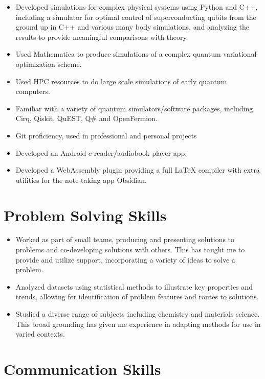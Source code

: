 \documentclass[margin, 10pt]{res} %
\begin{document}
\begin{resume}
\begin{itemize}
    \item Developed simulations for complex physical systems using
    Python and C++, including a simulator for optimal control of
    superconducting qubits from the ground up in C++ and various
    many body simulations, and analyzing the results to provide
    meaningful comparisons with theory.
    \item Used Mathematica to produce simulations of a complex quantum variational optimization scheme. 
    \item Used HPC resources to do large scale simulations of early
    quantum computers.
    \item Familiar with a variety of quantum simulators/software packages,
    including Cirq, Qiskit, QuEST, Q\# and OpenFermion.
    \item Git proficiency, used in professional and personal projects
    \item Developed an Android e-reader/audiobook player app.
    \item Developed a WebAssembly plugin providing a full LaTeX compiler with extra utilities for the note-taking app Obsidian.
\end{itemize}


\section{Problem Solving Skills}

\begin{itemize}
    \item Worked as part of small teams, producing and presenting
    solutions to problems and co-developing solutions with others.
    This has taught me to provide and utilize support, incorporating a
    variety of ideas to solve a problem.
    \item Analyzed datasets using statistical methods to illustrate key
    properties and trends, allowing for identification of problem
    features and routes to solutions.
    \item Studied a diverse range of subjects including chemistry and
    materials science. This broad grounding has given me
    experience in adapting methods for use in varied contexts.
\end{itemize}


\section{Communication Skills}


\end{resume}
\end{document}
